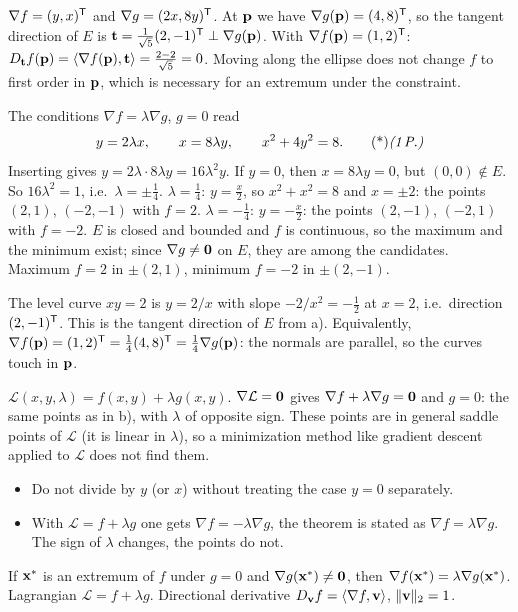 \begin{solution}
 $\nabla f=(y,x)^{\mathsf{T}}$ and $\nabla g=(2x,8y)^{\mathsf{T}}$. 
At $\mathbf{p}$ we have $\nabla g(\mathbf{p})=(4,8)^{\mathsf{T}}$, so the tangent direction of $E$ is $\mathbf{t}=\frac1{\sqrt5}(2,-1)^{\mathsf{T}}\perp\nabla g(\mathbf{p})$. With $\nabla f(\mathbf{p})=(1,2)^{\mathsf{T}}$:
$D_{\mathbf{t}}f(\mathbf{p})=\langle \nabla f(\mathbf{p}),\mathbf{t}\rangle=\frac{2-2}{\sqrt5}=0$. Moving along the ellipse does not change $f$ to first order in $\mathbf{p}$, which is necessary for an extremum under the constraint. 

 The conditions $\nabla f=\lambda\nabla g$, $g=0$ read
\[
y=2\lambda x,\qquad x=8\lambda y,\qquad x^2+4y^2=8.\ptd{1}
\]
Inserting gives $y=2\lambda\cdot8\lambda y=16\lambda^2y$. If $y=0$, then $x=8\lambda y=0$, but $(0,0)\notin E$. So $16\lambda^2=1$, i.e.\ $\lambda=\pm\frac14$. 
$\lambda=\frac14$: $y=\frac x2$, so $x^2+x^2=8$ and $x=\pm2$: the points $(2,1)$, $(-2,-1)$ with $f=2$.
$\lambda=-\frac14$: $y=-\frac x2$: the points $(2,-1)$, $(-2,1)$ with $f=-2$. 
$E$ is closed and bounded and $f$ is continuous, so the maximum and the minimum exist; since $\nabla g\neq\mathbf{0}$ on $E$, they are among the candidates. Maximum $f=2$ in $\pm(2,1)$, minimum $f=-2$ in $\pm(2,-1)$. 

 The level curve $xy=2$ is $y=2/x$ with slope $-2/x^2=-\frac12$ at $x=2$, i.e.\ direction $(2,-1)^{\mathsf{T}}$. This is the tangent direction of $E$ from a). Equivalently, $\nabla f(\mathbf{p})=(1,2)^{\mathsf{T}}=\frac14(4,8)^{\mathsf{T}}=\frac14\nabla g(\mathbf{p})$: the normals are parallel, so the curves touch in $\mathbf{p}$. 

 $\mathcal L(x,y,\lambda)=f(x,y)+\lambda g(x,y)$. $\nabla\mathcal L=\mathbf{0}$ gives $\nabla f+\lambda\nabla g=\mathbf{0}$ and $g=0$: the same points as in b), with $\lambda$ of opposite sign. These points are in general saddle points of $\mathcal L$ (it is linear in $\lambda$), so a minimization method like gradient descent applied to $\mathcal L$ does not find them. 

\begin{trap}
\begin{itemize}
\item Do not divide by $y$ (or $x$) without treating the case $y=0$ separately.
\item With $\mathcal L=f+\lambda g$ one gets $\nabla f=-\lambda\nabla g$, the theorem is stated as $\nabla f=\lambda\nabla g$. The sign of $\lambda$ changes, the points do not.
\end{itemize}
\end{trap}
\begin{heart}
If $\mathbf{x}^*$ is an extremum of $f$ under $g=0$ and $\nabla g(\mathbf{x}^*)\neq\mathbf{0}$, then $\nabla f(\mathbf{x}^*)=\lambda\nabla g(\mathbf{x}^*)$. Lagrangian $\mathcal L=f+\lambda g$. Directional derivative $D_{\mathbf{v}}f=\langle \nabla f,\mathbf{v}\rangle$, $\lVert \mathbf{v}\rVert_2=1$.
\end{heart}
\end{solution}

